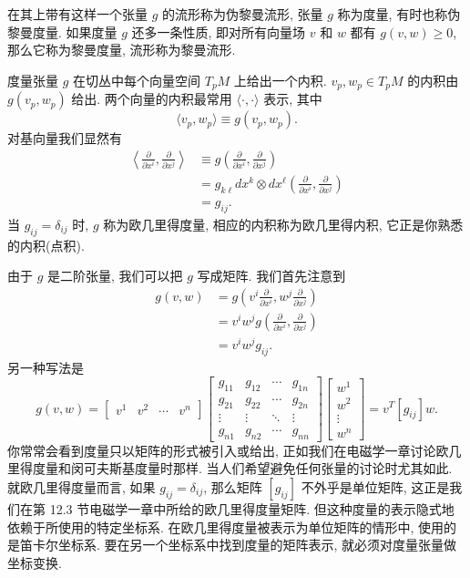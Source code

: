 在其上带有这样一个张量 $g$ 的流形称为伪黎曼流形, 张量 $g$ 称为度量, 有时也称伪黎曼度量. 如果度量 $g$ 还多一条性质, 即对所有向量场 $v$ 和 $w$ 都有 $g(v,w)\geq0$, 那么它称为黎曼度量, 流形称为黎曼流形.

度量张量 $g$ 在切丛中每个向量空间 $T_pM$ 上给出一个内积. $v_p,w_p\in T_pM$ 的内积由 $g(v_p,w_p)$ 给出. 两个向量的内积最常用 $\langle\cdot,\cdot\rangle$ 表示, 其中
\[
\langle v_p,w_p\rangle\equiv g(v_p,w_p).
\]
对基向量我们显然有
\begin{align*}
\left\langle\frac{\partial}{\partial x^i},\frac{\partial}{\partial x^j}\right\rangle
&\equiv g\left(\frac{\partial}{\partial x^i},\frac{\partial}{\partial x^j}\right)\\
&=g_{k\ell}dx^k\otimes dx^\ell\left(\frac{\partial}{\partial x^i},\frac{\partial}{\partial x^j}\right)\\
&=g_{ij}.
\end{align*}
当 $g_{ij}=\delta_{ij}$ 时, $g$ 称为欧几里得度量, 相应的内积称为欧几里得内积, 它正是你熟悉的内积(点积).

由于 $g$ 是二阶张量, 我们可以把 $g$ 写成矩阵. 我们首先注意到
\begin{align*}
g(v,w)&=g\left(v^i\frac{\partial}{\partial x^i},w^j\frac{\partial}{\partial x^j}\right)\\
&=v^iw^jg\left(\frac{\partial}{\partial x^i},\frac{\partial}{\partial x^j}\right)\\
&=v^iw^jg_{ij}.
\end{align*}
另一种写法是
\[
g(v,w)=\begin{bmatrix}v^1&v^2&\cdots&v^n\end{bmatrix}
\begin{bmatrix}
g_{11}&g_{12}&\cdots&g_{1n}\\
g_{21}&g_{22}&\cdots&g_{2n}\\
\vdots&\vdots&\ddots&\vdots\\
g_{n1}&g_{n2}&\cdots&g_{nn}
\end{bmatrix}
\begin{bmatrix}w^1\\w^2\\\vdots\\w^n\end{bmatrix}
=v^T[g_{ij}]w.
\]
你常常会看到度量只以矩阵的形式被引入或给出, 正如我们在电磁学一章讨论欧几里得度量和闵可夫斯基度量时那样. 当人们希望避免任何张量的讨论时尤其如此. 就欧几里得度量而言, 如果 $g_{ij}=\delta_{ij}$, 那么矩阵 $[g_{ij}]$ 不外乎是单位矩阵, 这正是我们在第 12.3 节电磁学一章中所给的欧几里得度量矩阵. 但这种度量的表示隐式地依赖于所使用的特定坐标系. 在欧几里得度量被表示为单位矩阵的情形中, 使用的是笛卡尔坐标系. 要在另一个坐标系中找到度量的矩阵表示, 就必须对度量张量做坐标变换.


